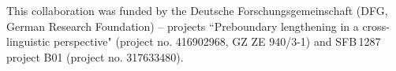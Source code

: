 \addchap{\lsAcknowledgementTitle} 

This collaboration was funded by the Deutsche Forschungsgemeinschaft (DFG, German Research Foundation) -- projects ``Preboundary lengthening in a cross-lin\-guis\-tic perspective" (project no. 416902968, GZ ZE 940/3-1) and SFB\,1287 project B01 (project no. 317633480).
